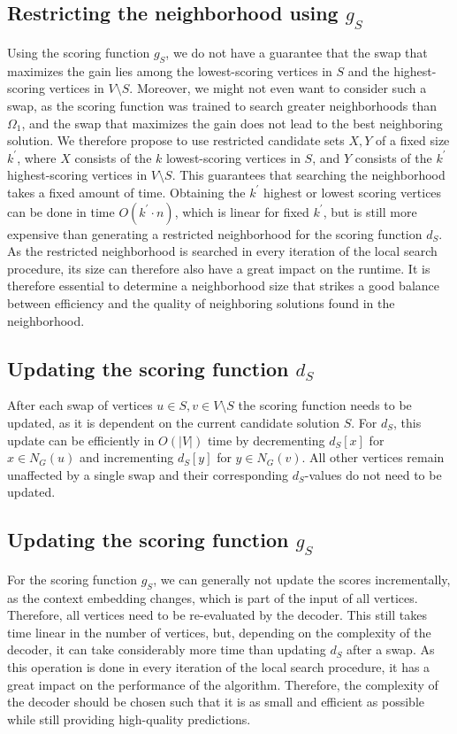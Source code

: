 \documentclass[draft,final]{vutinfth} %
\begin{document}
\subsection{Restricting the neighborhood using $g_S$}

Using the scoring function $g_S$, we do not have a guarantee that the swap that maximizes the gain lies among the lowest-scoring vertices in $S$ and the highest-scoring vertices in $V \setminus S$. Moreover, we might not even want to consider such a swap, as the scoring function was trained to search greater neighborhoods than $\Omega_1$, and the swap that maximizes the gain does not lead to the best neighboring solution. We therefore propose to use restricted candidate sets $X, Y$ of a fixed size $k^\prime$, where $X$ consists of the $k$ lowest-scoring vertices in $S$, and $Y$ consists of the $k^\prime$ highest-scoring vertices in $V \setminus S$. This guarantees that searching the neighborhood takes a fixed amount of time. 
Obtaining the $k^\prime$ highest or lowest scoring vertices can be done in time $O(k^\prime \cdot n)$, which is linear for fixed $k^\prime$, but is still more expensive than generating a restricted neighborhood for the scoring function $d_S$. As the restricted neighborhood is searched in every iteration of the local search procedure, its size can therefore also have a great impact on the runtime. It is therefore essential to determine a neighborhood size that strikes a good balance between efficiency and the quality of neighboring solutions found in the neighborhood.  


\subsection{Updating the scoring function $d_S$}
After each swap of vertices $u \in S, v \in V \setminus S$ the scoring function needs to be updated, as it is dependent on the current candidate solution $S$. For $d_S$, this update can be efficiently in $O(|V|)$ time by decrementing $d_S[x]$ for $x \in N_G(u)$ and incrementing $d_S[y]$ for $y \in N_G(v)$. All other vertices remain unaffected by a single swap and their corresponding $d_S$-values do not need to be updated. 

\subsection{Updating the scoring function $g_S$}

For the scoring function $g_S$, we can generally not update the scores incrementally, as the context embedding changes, which is part of the input of all vertices. Therefore, all vertices need to be re-evaluated by the decoder. This still takes time linear in the number of vertices, but, depending on the complexity of the decoder, it can take considerably more time than updating $d_S$ after a swap. As this operation is done in every iteration of the local search procedure, it has a great impact on the performance of the algorithm. Therefore, the complexity of the decoder should be chosen such that it is as small and efficient as possible while still providing high-quality predictions. 
\end{document}
